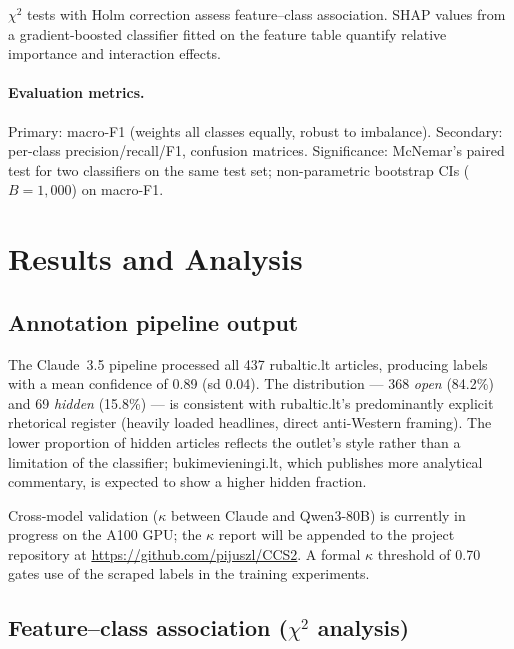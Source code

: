\documentclass[12pt,a4paper]{article}
\begin{document}
$\chi^2$ tests with Holm correction assess feature--class association.
SHAP values \parencite{lundberg2017shap} from a gradient-boosted classifier
fitted on the feature table quantify relative importance and interaction
effects.

\paragraph{Evaluation metrics.}
Primary: macro-F1 (weights all classes equally, robust to imbalance).
Secondary: per-class precision/recall/F1, confusion matrices.
Significance: McNemar's paired test for two classifiers on the same test set;
non-parametric bootstrap CIs ($B{=}1{,}000$) on macro-F1.


\section{Results and Analysis}
\label{sec:results}

\subsection{Annotation pipeline output}

The Claude~3.5 pipeline processed all 437 rubaltic.lt articles,
producing labels with a mean confidence of 0.89 (sd 0.04).
The distribution --- 368 \emph{open} (84.2\%) and 69 \emph{hidden} (15.8\%) ---
is consistent with rubaltic.lt's predominantly explicit rhetorical register
(heavily loaded headlines, direct anti-Western framing).
The lower proportion of hidden articles reflects the outlet's style rather than
a limitation of the classifier; bukimevieningi.lt, which publishes more
analytical commentary, is expected to show a higher hidden fraction.

Cross-model validation ($\kappa$ between Claude and Qwen3-80B) is currently in
progress on the A100 GPU; the $\kappa$ report will be appended to the project
repository at \url{https://github.com/pijuszl/CCS2}.
A formal $\kappa$ threshold of 0.70 gates use of the scraped labels in the
training experiments.

\subsection{Feature--class association ($\chi^2$ analysis)}
\end{document}
